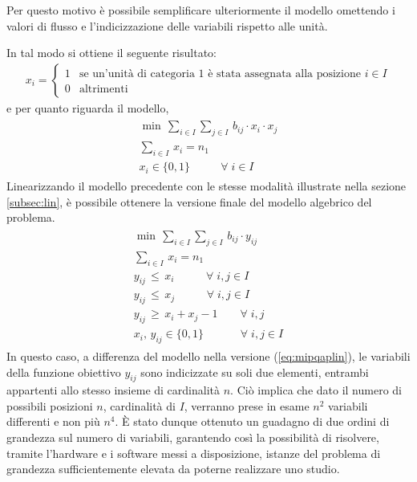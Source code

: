 Per questo motivo è possibile semplificare ulteriormente il modello omettendo i valori di flusso e l'indicizzazione delle variabili 
rispetto alle unità. 

\newpage \noindent
In tal modo si ottiene il seguente risultato:
\begin{align*}
    x_{i} = \begin{cases}  1 & \mbox{se un'unità di categoria 1} \mbox{ è stata assegnata alla posizione } i \in I\\ 0 & \mbox{altrimenti} \end{cases}
\end{align*}
e per quanto riguarda il modello,
\begin{align*}
	\begin{array}{l}
      \min \, \sum_{i\in I} \sum_{j\in I} \, b_{ij}\cdot x_{i}\cdot x_{j} \\
      \sum_{i\in I} \, x_{i} = n_1 \\
      x_{i} \in \{0,1\}           \;\;\,\qquad \forall \; i \in I
    \end{array}
\end{align*}
Linearizzando il modello precedente con le stesse modalità illustrate nella sezione \ref{subsec:lin}, è possibile ottenere la versione 
finale del modello algebrico del problema.
\begin{align}
    \label{eq:mipqapfinal}
	\begin{array}{l}
      \min \, \sum_{i\in I} \sum_{j\in I} \, b_{ij}\cdot y_{ij} \\
      \sum_{i\in I} \, x_{i} = n_1 \\
      y_{ij} \, \leq \, x_{i}   \;\;\;\qquad \forall \; i,j \in I \\ 
      y_{ij} \, \leq \, x_{j}   \;\;\;\qquad \forall \; i,j \in I \\
      y_{ij} \, \geq \, x_{i} + x_{j} - 1      \qquad \forall \; i,j \\
      x_{i} ,\, y_{ij} \in \{0,1\}      \;\quad\qquad \forall \; i,j \in I
    \end{array}
\end{align}
In questo caso, a differenza del modello nella versione (\ref{eq:mipqaplin}), le variabili della funzione obiettivo $y_{ij}$ sono 
indicizzate su soli due elementi, entrambi appartenti allo stesso insieme di cardinalità $n$. Ciò implica che dato il numero di possibili posizioni $n$, 
cardinalità di $I$, verranno  prese in esame $n^2$ variabili differenti e non più $n^4$. È stato dunque ottenuto un guadagno di due ordini di grandezza sul numero 
di variabili, garantendo così la possibilità di risolvere, tramite l'hardware e i software messi a disposizione, istanze del problema di grandezza 
sufficientemente elevata da poterne realizzare uno studio.


